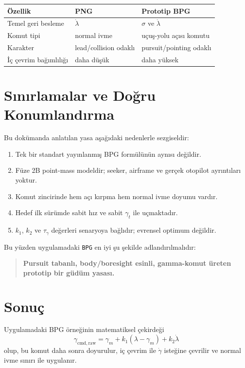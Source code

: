 \documentclass[11pt,a4paper]{article}
\begin{document}
\begin{center}
\begin{tabular}{@{}lll@{}}
\toprule
Özellik & PNG & Prototip BPG \\
\midrule
Temel geri besleme & \(\dot{\lambda}\) & \(\sigma\) ve \(\dot{\lambda}\) \\
Komut tipi & normal ivme & uçuş-yolu açısı komutu \\
Karakter & lead/collision odaklı & pursuit/pointing odaklı \\
İç çevrim bağımlılığı & daha düşük & daha yüksek \\
\bottomrule
\end{tabular}
\end{center}

\section{Sınırlamalar ve Doğru Konumlandırma}

Bu dokümanda anlatılan yasa aşağıdaki nedenlerle sezgiseldir:
\begin{enumerate}[leftmargin=1.2cm]
  \item Tek bir standart yayınlanmış BPG formülünün aynısı değildir.
  \item Füze 2B point-mass modeldir; seeker, airframe ve gerçek otopilot ayrıntıları yoktur.
  \item Komut zincirinde hem açı kırpma hem normal ivme doyumu vardır.
  \item Hedef ilk sürümde sabit hız ve sabit \(\gamma_t\) ile uçmaktadır.
  \item \(k_1\), \(k_2\) ve \(\tau_\gamma\) değerleri senaryoya bağlıdır; evrensel optimum değildir.
\end{enumerate}

Bu yüzden uygulamadaki \texttt{BPG} en iyi şu şekilde adlandırılmalıdır:
\begin{quote}
\textbf{Pursuit tabanlı, body/boresight esinli, gamma-komut üreten prototip bir güdüm yasası.}
\end{quote}

\section{Sonuç}

Uygulamadaki BPG örneğinin matematiksel çekirdeği
\begin{equation}
\gamma_{\mathrm{cmd,raw}}
=
\gamma_m + k_1(\lambda-\gamma_m) + k_2\dot{\lambda}
\end{equation}
olup, bu komut daha sonra doyurulur, iç çevrim ile \(\dot{\gamma}\) isteğine çevrilir ve normal ivme sınırı ile uygulanır.
\end{document}
